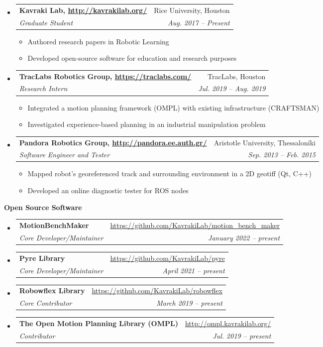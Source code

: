 \documentclass[letterpaper,11pt]{article}
\makeatletter
\newcommand{\resitem}[1]{\item #1 \vspace{-2pt}}
\newcommand{\resheading}[1]{{\large \colorbox{mygrey}{\begin{minipage}{\textwidth}{\textbf{#1 \vphantom{p\^{E}}}}\end{minipage}}}}
\newcommand{\ressubheading}[4]{
\begin{tabular*}{7.0in}{l@{\extracolsep{\fill}}r}
		\textbf{#1} & #2 \\
		\textit{#3} & \textit{#4} \\
\end{tabular*}\vspace{-6pt}}
\makeatother
\begin{document}
\begin{itemize}
	
    \item
        \ressubheading{Kavraki Lab, \url{http://kavrakilab.org/}}
	{Rice University, Houston}{Graduate Student}
	{Aug. 2017 -- Present  }
	\begin{itemize}
		\resitem{Authored research papers in Robotic Learning}
		\resitem{Developed open-source software for education and research purposes}
	\end{itemize}
    \item
    \ressubheading{TracLabs Robotics Group, \url{https://traclabs.com/}}
    {TracLabs, Houston}{Research Intern}
    {Jul. 2019 -- Aug. 2019}
    \begin{itemize}
    	\resitem{Integrated a motion planning framework (OMPL) with existing infrastructure (CRAFTSMAN)}
    \resitem{Investigated experience-based planning in an industrial manipulation problem}
    \end{itemize}
	\item
     \ressubheading{Pandora Robotics Group, \url{http://pandora.ee.auth.gr/}}
	{Aristotle University, Thessaloníki}{Software Engineer and Tester}
	{Sep. 2013 -- Feb. 2015}
	\begin{itemize}
		\resitem{Mapped robot’s georeferenced track and surrounding environment in a 2D geotiff (Qt, C++)}
		\resitem{Developed an online diagnostic tester for ROS nodes}
	\end{itemize}
\end{itemize}


\resheading{Open Source Software}
\begin{itemize}
    \item \ressubheading{MotionBenchMaker}
        {\url{https://github.com/KavrakiLab/motion_bench_maker}}{Core Developer/Maintainer}{January 2022 -- present}
    \item \ressubheading{Pyre Library}
        {\url{https://github.com/KavrakiLab/pyre}}{Core Developer/Maintainer}{April 2021 -- present}
    \item \ressubheading{Robowflex Library}
        {\url{https://github.com/KavrakiLab/robowflex}}{Core Contributor}{March 2019 -- present}
    \item \ressubheading{The Open Motion Planning Library (OMPL)}
        {\url{http://ompl.kavrakilab.org/}}{Contributor}{Jul. 2019 -- present}
\end{itemize}	
\end{document}
